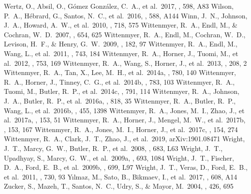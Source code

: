 \documentclass[twocolumn]{aastex62}
\begin{document}
\begin{CJK*}{UTF8}{min}
\begin{thebibliography}{}
 Wertz, O., Absil, O., G{\'o}mez Gonz{\'a}lez, C.~A., et al.\ 2017, \aap, 598, A83
 Wilson, P.~A., H{\'e}brard, G., Santos, N.~C., et al.\ 2016, \aap, 588, A144
 Winn, J.~N., Johnson, J.~A., Howard, A.~W., et al.\ 2010, \apj, 718, 575
 Wittenmyer, R.~A., Endl, M., \& Cochran, W.~D.\ 2007, \apj, 654, 625
 Wittenmyer, R.~A., Endl, M., Cochran, W.~D., Levison, H.~F., \& Henry, G.~W.\ 2009, \apjs, 182, 97
 Wittenmyer, R.~A., Endl, M., Wang, L., et al.\ 2011, \apj, 743, 184
 Wittenmyer, R.~A., Horner, J., Tuomi, M., et al.\ 2012, \apj, 753, 169
 Wittenmyer, R.~A., Wang, S., Horner, J., et al.\ 2013, \apjs, 208, 2
 Wittenmyer, R.~A., Tan, X., Lee, M.~H., et al.\ 2014a, \apj, 780, 140
 Wittenmyer, R.~A., Horner, J., Tinney, C.~G., et al.\ 2014b, \apj, 783, 103
 Wittenmyer, R.~A., Tuomi, M., Butler, R.~P., et al.\ 2014c, \apj, 791, 114
 Wittenmyer, R.~A., Johnson, J.~A., Butler, R.~P., et al.\ 2016a, \apj, 818, 35
 Wittenmyer, R.~A., Butler, R.~P., Wang, L., et al.\ 2016b, \mnras, 455, 1398
 Wittenmyer, R.~A., Jones, M.~I., Zhao, J., et al.\ 2017a, \aj, 153, 51
 Wittenmyer, R.~A., Horner, J., Mengel, M.~W., et al.\ 2017b, \aj, 153, 167
 Wittenmyer, R.~A., Jones, M.~I., Horner, J., et al.\ 2017c, \aj, 154, 274
 Wittenmyer, R.~A., Clark, J.~T., Zhao, J., et al.\ 2019, arXiv:1901.08471
 Wright, J.~T., Marcy, G.~W., Butler, R.~P., et al.\ 2008, \apjl, 683, L63
 Wright, J.~T., Upadhyay, S., Marcy, G.~W., et al.\ 2009a, \apj, 693, 1084
 Wright, J.~T., Fischer, D.~A., Ford, E.~B., et al.\ 2009b, \apjl, 699, L97
 Wright, J.~T., Veras, D., Ford, E.~B., et al.\ 2011, \apj, 730, 93
 Y{\i}lmaz, M., Sato, B., Bikmaev, I., et al.\ 2017, \aap, 608, A14
 Zucker, S., Mazeh, T., Santos, N.~C., Udry, S., \& Mayor, M.\ 2004, \aap, 426, 695


\end{thebibliography}
\end{CJK*}
\end{document}
